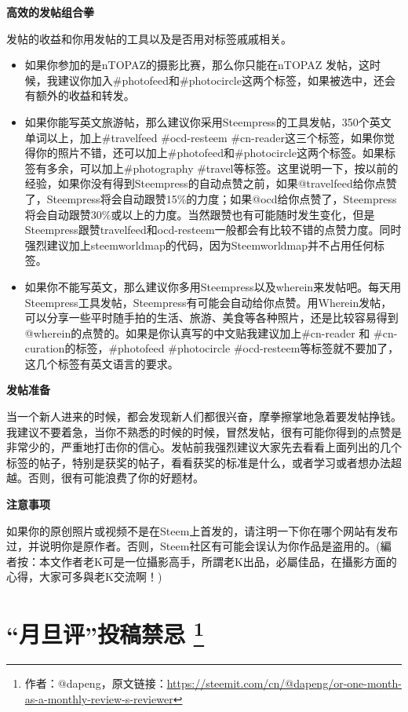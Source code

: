 \documentclass[]{ctexbook}
\begin{document}
\textbf{高效的发帖组合拳}

发帖的收益和你用发帖的工具以及是否用对标签戚戚相关。

\begin{itemize}
\item
  如果你参加的是nTOPAZ的摄影比赛，那么你只能在nTOPAZ 发帖，这时候，我建议你加入\#photofeed和\#photocircle这两个标签，如果被选中，还会有额外的收益和转发。
\item
  如果你能写英文旅游帖，那么建议你采用Steempress的工具发帖，350个英文单词以上，加上\#travelfeed \#ocd-resteem \#cn-reader这三个标签，如果你觉得你的照片不错，还可以加上\#photofeed和\#photocircle这两个标签。如果标签有多余，可以加上\#photography \#travel等标签。这里说明一下，按以前的经验，如果你没有得到Steempress的自动点赞之前，如果@travelfeed给你点赞了，Steempress将会自动跟赞15\%的力度；如果@ocd给你点赞了，Steempress将会自动跟赞30\%或以上的力度。当然跟赞也有可能随时发生变化，但是Steempress跟赞travelfeed和ocd-resteem一般都会有比较不错的点赞力度。同时强烈建议加上steemworldmap的代码，因为Steemworldmap并不占用任何标签。
\item
  如果你不能写英文，那么建议你多用Steempress以及wherein来发帖吧。每天用Steempress工具发帖，Steempress有可能会自动给你点赞。用Wherein发帖，可以分享一些平时随手拍的生活、旅游、美食等各种照片，还是比较容易得到@wherein的点赞的。如果是你认真写的中文贴我建议加上\#cn-reader 和 \#cn-curation的标签，\#photofeed \#photocircle \#ocd-resteem等标签就不要加了，这几个标签有英文语言的要求。
\end{itemize}

\textbf{发帖准备}

当一个新人进来的时候，都会发现新人们都很兴奋，摩拳擦掌地急着要发帖挣钱。我建议不要着急，当你不熟悉的时候的时候，冒然发帖，很有可能你得到的点赞是非常少的，严重地打击你的信心。发帖前我强烈建议大家先去看看上面列出的几个标签的帖子，特别是获奖的帖子，看看获奖的标准是什么，或者学习或者想办法超越。否则，很有可能浪费了你的好题材。

\textbf{注意事项}

如果你的原创照片或视频不是在Steem上首发的，请注明一下你在哪个网站有发布过，并说明你是原作者。否则，Steem社区有可能会误认为你作品是盗用的。(編者按：本文作者老K可是一位攝影高手，所謂老K出品，必屬佳品，在攝影方面的心得，大家可多與老K交流啊！)

\hypertarget{cn-reader}{%
\section[``月旦评''投稿禁忌 ]{\texorpdfstring{``月旦评''投稿禁忌 \footnote{作者：@dapeng，原文链接：\url{https://steemit.com/cn/@dapeng/or-one-month-as-a-monthly-review-s-reviewer}}}{``月旦评''投稿禁忌 }}\label{cn-reader}}
\end{document}
